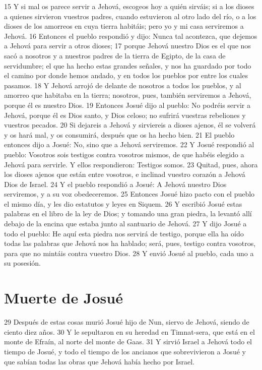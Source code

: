 15 Y si mal os parece servir a Jehová, escogeos hoy a quién sirváis; si a los dioses a quienes sirvieron vuestros padres, cuando estuvieron al otro lado del río, o a los dioses de los amorreos en cuya tierra habitáis; pero yo y mi casa serviremos a Jehová.
16 Entonces el pueblo respondió y dijo: Nunca tal acontezca, que dejemos a Jehová para servir a otros dioses;
17 porque Jehová nuestro Dios es el que nos sacó a nosotros y a nuestros padres de la tierra de Egipto, de la casa de servidumbre; el que ha hecho estas grandes señales, y nos ha guardado por todo el camino por donde hemos andado, y en todos los pueblos por entre los cuales pasamos.
18 Y Jehová arrojó de delante de nosotros a todos los pueblos, y al amorreo que habitaba en la tierra; nosotros, pues, también serviremos a Jehová, porque él es nuestro Dios.
19 Entonces Josué dijo al pueblo: No podréis servir a Jehová, porque él es Dios santo, y Dios celoso; no sufrirá vuestras rebeliones y vuestros pecados.
20 Si dejareis a Jehová y sirviereis a dioses ajenos, él se volverá y os hará mal, y os consumirá, después que os ha hecho bien.
21 El pueblo entonces dijo a Josué: No, sino que a Jehová serviremos.
22 Y Josué respondió al pueblo: Vosotros sois testigos contra vosotros mismos, de que habéis elegido a Jehová para servirle. Y ellos respondieron: Testigos somos.
23 Quitad, pues, ahora los dioses ajenos que están entre vosotros, e inclinad vuestro corazón a Jehová Dios de Israel.
24 Y el pueblo respondió a Josué: A Jehová nuestro Dios serviremos, y a su voz obedeceremos.
25 Entonces Josué hizo pacto con el pueblo el mismo día, y les dio estatutos y leyes en Siquem.
26 Y escribió Josué estas palabras en el libro de la ley de Dios; y tomando una gran piedra, la levantó allí debajo de la encina que estaba junto al santuario de Jehová.
27 Y dijo Josué a todo el pueblo: He aquí esta piedra nos servirá de testigo, porque ella ha oído todas las palabras que Jehová nos ha hablado; será, pues, testigo contra vosotros, para que no mintáis contra vuestro Dios.
28 Y envió Josué al pueblo, cada uno a su posesión.

\section*{Muerte de Josué}

29 Después de estas cosas murió Josué hijo de Nun, siervo de Jehová, siendo de ciento diez años.
30 Y le sepultaron en su heredad en Timnat-sera, que está en el monte de Efraín, al norte del monte de Gaas.
31 Y sirvió Israel a Jehová todo el tiempo de Josué, y todo el tiempo de los ancianos que sobrevivieron a Josué y que sabían todas las obras que Jehová había hecho por Israel.

